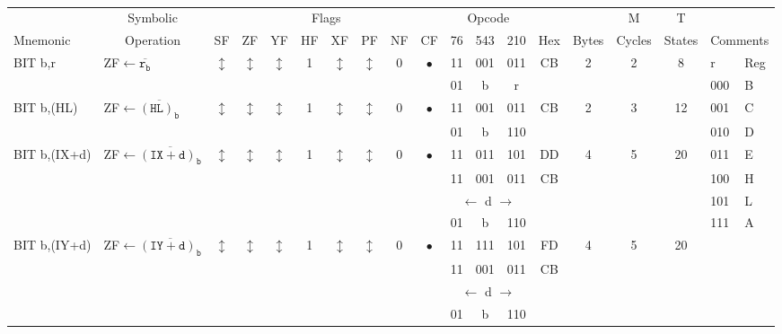 \documentclass[oneside,a4paper]{book}
\begin{document}
{\tt \scriptsize \setlength{\fboxsep}{0.25mm}
\setlength{\tabcolsep}{1mm}
\begin{tabular}{llc@{ }c@{ }c@{ }c@{ }c@{ }c@{ }c@{ }cc@{ }c@{ }cccccll}\hline
 & \multicolumn{1}{c}{Symbolic} & \multicolumn{8}{c}{Flags} & \multicolumn{3}{c}{Opcode} & & & M & T & \\
Mnemonic & \multicolumn{1}{c}{Operation} & SF & ZF & YF & HF & XF & PF & NF & CF & 76 & 543 & 210 
	& Hex & Bytes & Cycles & States & \multicolumn{2}{l}{Comments} \\ \hline

BIT b,r & ZF$\leftarrow\mathtt{\overline{r_b}}$ &
	$\updownarrow$\footnotemark[1] & $\updownarrow$ & $\updownarrow$\footnotemark[1] & 1 & $\updownarrow$\footnotemark[1] & 
	$\updownarrow$\footnotemark[1] & 0 & $\bullet$ & 11 & 001 & 011 
	& CB & 2 & 2 & 8 & r & Reg \\ \cline{18-19}
\multicolumn{10}{c}{} & 01 & b & r & & \multicolumn{3}{c}{} & 000 & B \\

BIT b,(HL) & \mbox{ZF$\leftarrow\mathtt{\overline{(HL)_b}}$} &
	$\updownarrow$\footnotemark[1] & $\updownarrow$ & $\updownarrow$\footnotemark[1] & 1 & $\updownarrow$\footnotemark[1] & 
	$\updownarrow$\footnotemark[1] & 0 & $\bullet$ & 11 & 001 & 011 
	& CB & 2 & 3 & 12 & 001 & C \\ 
\multicolumn{10}{c}{} & 01 & b & 110 & & \multicolumn{3}{c}{} & 010 & D \\

BIT b,(IX+d)\footnotemark[2] & ZF$\leftarrow\mathtt{\overline{(IX+d)_b}}$ &
	$\updownarrow$\footnotemark[1] & $\updownarrow$ & $\updownarrow$\footnotemark[1] & 1 & $\updownarrow$\footnotemark[1] & 
	$\updownarrow$\footnotemark[1] & 0 & $\bullet$ & 11 & 011 & 101 
	& DD & 4 & 5 & 20 & 011 & E \\ 
\multicolumn{10}{c}{} & 11 & 001 & 011 & CB & \multicolumn{3}{c}{} & 100 & H \\
\multicolumn{10}{c}{} & \multicolumn{3}{c}{$\leftarrow$ d $\rightarrow$} & \multicolumn{4}{c}{} & 101 & L \\
\multicolumn{10}{c}{} & 01 & b  & 110 & & \multicolumn{3}{c}{} & 111 & A \\

BIT b,(IY+d)\footnotemark[2] & ZF$\leftarrow\mathtt{\overline{(IY+d)_b}}$ &
	$\updownarrow$\footnotemark[1] & $\updownarrow$ & $\updownarrow$\footnotemark[1] & 1 & $\updownarrow$\footnotemark[1] & 
	$\updownarrow$\footnotemark[1] & 0 & $\bullet$ & 11 & 111 & 101 
	& FD & 4 & 5 & 20 & & \\ 
\multicolumn{10}{c}{} & 11 & 001 & 011 & CB & \multicolumn{3}{c}{} & & \\
\multicolumn{10}{c}{} & \multicolumn{3}{c}{$\leftarrow$ d $\rightarrow$} & \multicolumn{4}{c}{} & &  \\
\multicolumn{10}{c}{} & 01 & b  & 110 & & \multicolumn{3}{c}{} & & \\


\end{tabular}}
\end{document}
